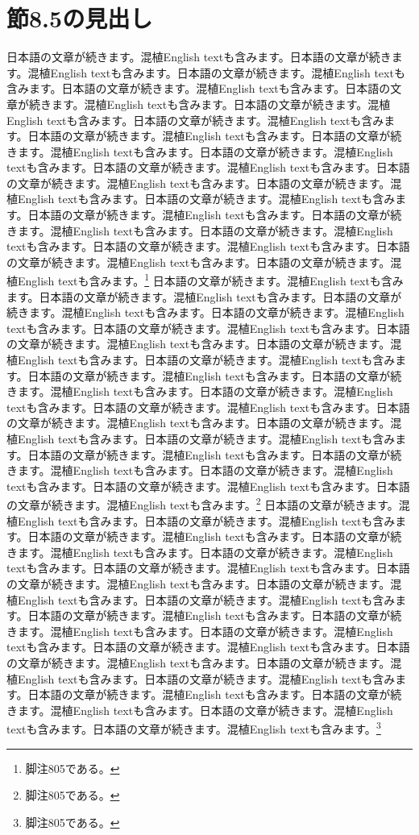 \documentclass[pdflatex,book]{jlreq}
\begin{document}
\section{節8.5の見出し}
日本語の文章が続きます。混植English textも含みます。日本語の文章が続きます。混植English textも含みます。日本語の文章が続きます。混植English textも含みます。日本語の文章が続きます。混植English textも含みます。日本語の文章が続きます。混植English textも含みます。日本語の文章が続きます。混植English textも含みます。日本語の文章が続きます。混植English textも含みます。日本語の文章が続きます。混植English textも含みます。日本語の文章が続きます。混植English textも含みます。日本語の文章が続きます。混植English textも含みます。日本語の文章が続きます。混植English textも含みます。日本語の文章が続きます。混植English textも含みます。日本語の文章が続きます。混植English textも含みます。日本語の文章が続きます。混植English textも含みます。日本語の文章が続きます。混植English textも含みます。日本語の文章が続きます。混植English textも含みます。日本語の文章が続きます。混植English textも含みます。日本語の文章が続きます。混植English textも含みます。日本語の文章が続きます。混植English textも含みます。日本語の文章が続きます。混植English textも含みます。\footnote{脚注805である。}
日本語の文章が続きます。混植English textも含みます。日本語の文章が続きます。混植English textも含みます。日本語の文章が続きます。混植English textも含みます。日本語の文章が続きます。混植English textも含みます。日本語の文章が続きます。混植English textも含みます。日本語の文章が続きます。混植English textも含みます。日本語の文章が続きます。混植English textも含みます。日本語の文章が続きます。混植English textも含みます。日本語の文章が続きます。混植English textも含みます。日本語の文章が続きます。混植English textも含みます。日本語の文章が続きます。混植English textも含みます。日本語の文章が続きます。混植English textも含みます。日本語の文章が続きます。混植English textも含みます。日本語の文章が続きます。混植English textも含みます。日本語の文章が続きます。混植English textも含みます。日本語の文章が続きます。混植English textも含みます。日本語の文章が続きます。混植English textも含みます。日本語の文章が続きます。混植English textも含みます。日本語の文章が続きます。混植English textも含みます。日本語の文章が続きます。混植English textも含みます。\footnote{脚注805である。}
日本語の文章が続きます。混植English textも含みます。日本語の文章が続きます。混植English textも含みます。日本語の文章が続きます。混植English textも含みます。日本語の文章が続きます。混植English textも含みます。日本語の文章が続きます。混植English textも含みます。日本語の文章が続きます。混植English textも含みます。日本語の文章が続きます。混植English textも含みます。日本語の文章が続きます。混植English textも含みます。日本語の文章が続きます。混植English textも含みます。日本語の文章が続きます。混植English textも含みます。日本語の文章が続きます。混植English textも含みます。日本語の文章が続きます。混植English textも含みます。日本語の文章が続きます。混植English textも含みます。日本語の文章が続きます。混植English textも含みます。日本語の文章が続きます。混植English textも含みます。日本語の文章が続きます。混植English textも含みます。日本語の文章が続きます。混植English textも含みます。日本語の文章が続きます。混植English textも含みます。日本語の文章が続きます。混植English textも含みます。日本語の文章が続きます。混植English textも含みます。\footnote{脚注805である。}
\end{document}
